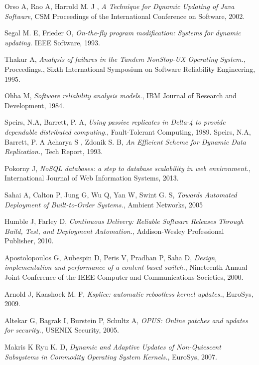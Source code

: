 \documentclass[a4paper,11pt,twoside]{report}
\begin{document}
\clearpage

\begin{thebibliography}{1}
 Orso A, Rao A, Harrold M. J , {\em A Technique for Dynamic Updating of Java Software}, CSM Proceedings of the International Conference on Software, 2002.
 
   Segal M. E, Frieder O, \textit{On-the-fly program modification: Systems for dynamic updating.} IEEE Software, 1993.

    Thakur A, {\em Analysis of failures in the Tandem NonStop-UX Operating System.}, Proceedings., Sixth International Symposium on Software Reliability Engineering, 1995. 
   
     Ohba M, {\em Software reliability analysis models.}, IBM Journal of Research and Development, 1984.
    
     Speirs, N.A, Barrett, P. A, {\em Using passive replicates in Delta-4 to provide dependable distributed computing.}, Fault-Tolerant Computing, 1989. 
    Speirs, N.A, Barrett, P. A
      Acharya S , Zdonik S. B, {\em An Efficient Scheme for Dynamic Data Replication.}, Tech Report, 1993. 
   
	  Pokorny J, {\em NoSQL databases: a step to database scalability in web environment.}, International Journal of Web Information Systems, 2013. 
	 
	 Sahai A, Calton P, Jung G, Wu Q, Yan W, Swint G. S, {\em Towards Automated Deployment of Built-to-Order Systems.}, Ambient Networks, 2005  
	  
   Humble J, Farley D, {\em Continuous Delivery: Reliable Software Releases Through Build, Test, and Deployment Automation.}, Addison-Wesley Professional Publisher, 2010.     
   
    Apostolopoulos G, Aubespin D, Peris V, Pradhan P, Saha D, {\em Design, implementation and performance of a content-based switch.}, Nineteenth Annual Joint Conference of the IEEE Computer and Communications Societies, 2000.
   
   Arnold J, Kaashoek M. F, {\em Ksplice: automatic rebootless kernel updates.}, EuroSys, 2009.
  
    Altekar G, Bagrak I, Burstein P, Schultz A, {\em OPUS: Online patches and updates for security.}, USENIX Security, 2005.


   Makris K Ryu K. D, {\em Dynamic and Adaptive Updates of Non-Quiescent Subsystems in Commodity Operating System Kernels.}, EuroSys, 2007. 
  

\end{thebibliography}
\end{document}

